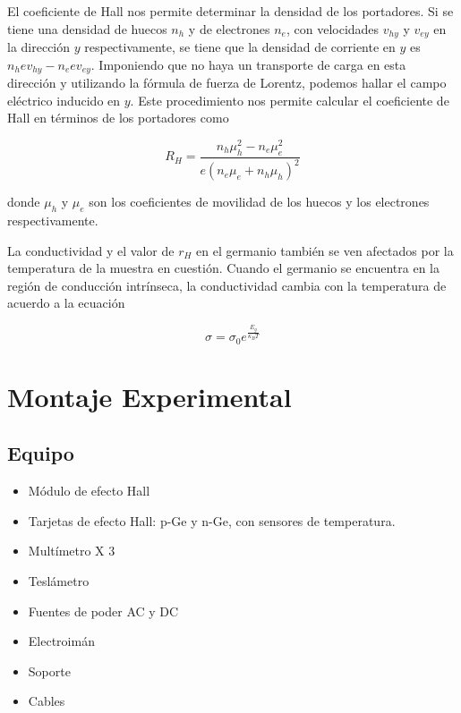 \documentclass[twocolumn,showkeys,preprintnumbers,amsmath,amssymb]{revtex4}
\begin{document}
	El coeficiente de Hall nos permite determinar la densidad de los portadores. Si se tiene una densidad de huecos $n_h$ y de electrones $n_e$, con velocidades $v_{hy}$ y $v_{ey}$ en la direcci\'on $y$ respectivamente, se tiene que la densidad de corriente en $y$ es $n_hev_{hy}-n_eev_{ey}$. Imponiendo que no haya un transporte de carga en esta direcci\'on y utilizando la f\'ormula de fuerza de Lorentz, podemos hallar el campo el\'ectrico inducido en $y$. Este procedimiento nos permite calcular el coeficiente de Hall en t\'erminos de los portadores como

	\begin{equation} \label{eq:rhcomplicado}
		R_H=\frac{n_h\mu_h^2-n_e\mu_e^2}{e(n_e\mu_e+n_h\mu_h)^2}
	\end{equation}

	donde $\mu_h$ y $\mu_e$ son los coeficientes de movilidad de los huecos y los electrones respectivamente.
	
	La conductividad y el valor de $r_H$ en el germanio también se ven afectados por la temperatura de la muestra en cuestión. Cuando el germanio se encuentra en la región de conducción intrínseca, la conductividad cambia con la temperatura de acuerdo a la ecuación
	
	\begin{equation}
		\sigma = \sigma_0 e^{\frac{E_g}{\kappa_B T}} \label{eq:CondTemp}
	\end{equation}
	
	
	
	

\section{\label{sec:mont} Montaje Experimental}

	\subsection*{Equipo}

		\begin{itemize}
	
			\item Módulo de efecto Hall
	
			\item Tarjetas de efecto Hall: p-Ge y n-Ge, con sensores de temperatura.
	
			\item Multímetro X 3
		
			\item Teslámetro
	
			\item Fuentes de poder AC y DC
	
			\item Electroimán
	
			\item Soporte
	
			\item Cables
	
	\end{itemize}
\end{document}
